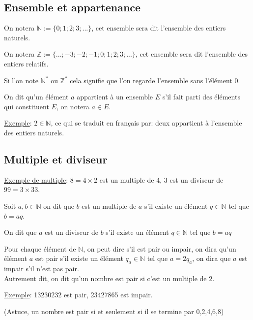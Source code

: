 \documentclass[french]{book}
\begin{document}
\subsection{Ensemble et appartenance}
\begin{defn}
On notera $\mathbb{N}:=\{0;1;2;3;...\}$, cet ensemble sera dit l'ensemble des entiers naturels.

On notera $\mathbb{Z}:=\{...;-3;-2;-1;0;1;2;3;...\}$, cet ensemble sera dit l'ensemble des entiers relatifs.

Si l'on note $\mathbb{N}^{*}$ ou $\mathbb{Z}^{*}$ cela signifie que l'on regarde l'ensemble sans l'élément $0$.

On dit qu'un élément $a$ appartient à un ensemble $E$ s'il fait parti des éléments qui constituent $E$, on notera $a\in E$. 
\end{defn}


\underline{Exemple}: $2\in \mathbb{N}$, ce qui se traduit en français par: deux appartient à l'ensemble des entiers naturels.


\subsection{Multiple et diviseur}

\underline{Exemple de multiple}: $8=4 \times 2$ est un multiple de $4$, $3$ est un diviseur de $99=3 \times 33$.

\begin{defn}
Soit $a,b\in \mathbb{N}$ on dit que $b$ est un multiple de $a$ s'il existe un élément $q\in \mathbb{N}$ tel que $b=aq$.

On dit que $a$ est un diviseur de $b$ s'il existe un élément $q\in \mathbb{N}$ tel que $b=aq$
\end{defn}


\begin{defn}
Pour chaque élément de $\mathbb{N}$, on peut dire s'il est pair ou impair, on dira qu'un élément $a$ est pair s'il existe un élément $q_a \in \mathbb{N}$ tel que $a=2q_{a}$, on dira que $a$ est impair s'il n'est pas pair.\\

Autrement dit, on dit qu'un nombre est pair si c'est un multiple de 2.
\end{defn}


\underline{Exemple}: 13230232 est pair, 23427865 est impair.

(Astuce, un nombre est pair si et seulement si il se termine par 0,2,4,6,8) 
\end{document}
